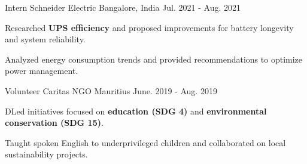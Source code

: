 \begin{cventries}
  \cventry
    {Intern} %
    {Schneider Electric} %
    {Bangalore, India} %
    {Jul. 2021 - Aug. 2021} %
    {
      \begin{cvitems} %
        \item {Researched \textbf{UPS eﬃciency} and proposed improvements for battery longevity and system reliability.}
        \item {Analyzed energy consumption trends and provided recommendations to optimize power management.}
      \end{cvitems}
    }

  \cventry
    {Volunteer} %
    {Caritas NGO} %
    {Mauritius} %
    {June. 2019 - Aug. 2019} %
    {
      \begin{cvitems} %
        \item {DLed initiatives focused on \textbf{education (SDG 4)} and \textbf{environmental conservation (SDG 15)}.}
        \item {Taught spoken English to underprivileged children and collaborated on local sustainability projects.}
      \end{cvitems}
    }

\end{cventries}
